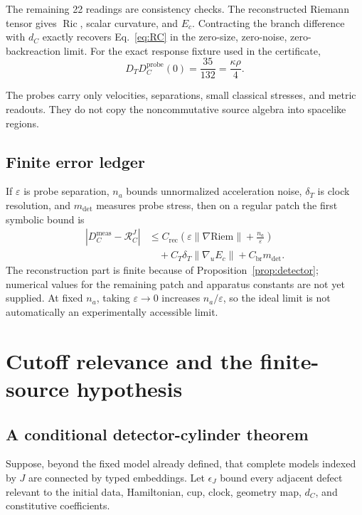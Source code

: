 \documentclass[11pt]{article}
\theoremstyle{definition}
\theoremstyle{remark}
\newcommand{\Ric}{\operatorname{Ric}}
\newcommand{\RC}{\mathcal{R}_{C}}
\begin{document}
The remaining 22 readings are consistency checks. The reconstructed Riemann tensor gives $\Ric$, scalar curvature, and $E_c$. Contracting the branch difference with $d_C$ exactly recovers Eq.~\eqref{eq:RC} in the zero-size, zero-noise, zero-backreaction limit. For the exact response fixture used in the certificate,
\begin{equation}
  D_TD_C^{\mathrm{probe}}(0)=\frac{35}{132}=\frac{\kappa\rho}{4}.
\end{equation}

The probes carry only velocities, separations, small classical stresses, and metric readouts. They do not copy the noncommutative source algebra into spacelike regions.

\subsection{Finite error ledger}

If $\varepsilon$ is probe separation, $n_a$ bounds unnormalized acceleration noise, $\delta_T$ is clock resolution, and $m_{\mathrm{det}}$ measures probe stress, then on a regular patch the first symbolic bound is
\begin{align}\label{eq:error}
 |D_C^{\mathrm{meas}}-\RC^{J}|
 &\le C_{\mathrm{rec}}
 \left(\varepsilon\|\nabla\mathrm{Riem}\|+\frac{n_a}{\varepsilon}\right)\\
 &\quad+C_T\delta_T\|\nabla_uE_c\|+C_{\mathrm{br}}m_{\mathrm{det}}.
\end{align}
The reconstruction part is finite because of Proposition~\ref{prop:detector}; numerical values for the remaining patch and apparatus constants are not yet supplied. At fixed $n_a$, taking $\varepsilon\to0$ increases $n_a/\varepsilon$, so the ideal limit is not automatically an experimentally accessible limit.

\section{Cutoff relevance and the finite-source hypothesis}

\subsection{A conditional detector-cylinder theorem}

Suppose, beyond the fixed model already defined, that complete models indexed by $J$ are connected by typed embeddings. Let $\epsilon_J$ bound every adjacent defect relevant to the initial data, Hamiltonian, cup, clock, geometry map, $d_C$, and constitutive coefficients.
\end{document}
